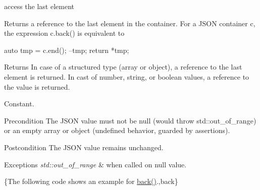 access the last element 

Returns a reference to the last element in the container. For a J\-S\-O\-N container {\ttfamily c}, the expression {\ttfamily c.\-back()} is equivalent to 
\begin{DoxyCode}
\textcolor{keyword}{auto} tmp = c.end();
--tmp;
\textcolor{keywordflow}{return} *tmp;
\end{DoxyCode}


\begin{DoxyReturn}{Returns}
In case of a structured type (array or object), a reference to the last element is returned. In cast of number, string, or boolean values, a reference to the value is returned.
\end{DoxyReturn}
Constant.

\begin{DoxyPrecond}{Precondition}
The J\-S\-O\-N value must not be {\ttfamily null} (would throw {\ttfamily std\-::out\-\_\-of\-\_\-range}) or an empty array or object (undefined behavior, guarded by assertions). 
\end{DoxyPrecond}
\begin{DoxyPostcond}{Postcondition}
The J\-S\-O\-N value remains unchanged.
\end{DoxyPostcond}

\begin{DoxyExceptions}{Exceptions}
{\em std\-::out\-\_\-of\-\_\-range} & when called on {\ttfamily null} value.\\
\hline
\end{DoxyExceptions}
\{The following code shows an example for {\ttfamily \hyperlink{classnlohmann_1_1basic__json_a71b1d38ef402dfee58fba1fe01fa67f5}{back()}}.,back\}

